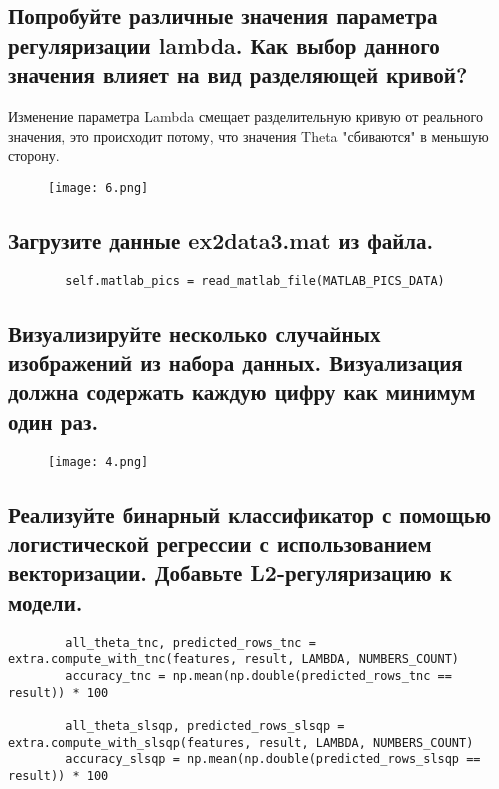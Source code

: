 \subsection{Попробуйте различные значения параметра регуляризации lambda. Как выбор данного значения влияет на вид разделяющей кривой?}

Изменение параметра Lambda смещает разделительную кривую от реального значения, это происходит потому, что значения Theta "сбиваются" в меньшую сторону.

\begin{figure}[h]
\centering
    \texttt{[image: 6.png]}
    \label{sec:purpose:payings}
\end{figure}

\subsection{Загрузите данные ex2data3.mat из файла.}

\begin{lstlisting}
        self.matlab_pics = read_matlab_file(MATLAB_PICS_DATA)
\end{lstlisting}

\subsection{Визуализируйте несколько случайных изображений из набора данных. Визуализация должна содержать каждую цифру как минимум один раз.}

\begin{figure}[h]
\centering
    \texttt{[image: 4.png]}
    \label{sec:purpose:payings}
\end{figure}

\subsection{Реализуйте бинарный классификатор с помощью логистической регрессии с использованием векторизации. Добавьте L2-регуляризацию к модели.
}

\begin{lstlisting}
        all_theta_tnc, predicted_rows_tnc = extra.compute_with_tnc(features, result, LAMBDA, NUMBERS_COUNT)
        accuracy_tnc = np.mean(np.double(predicted_rows_tnc == result)) * 100

        all_theta_slsqp, predicted_rows_slsqp = extra.compute_with_slsqp(features, result, LAMBDA, NUMBERS_COUNT)
        accuracy_slsqp = np.mean(np.double(predicted_rows_slsqp == result)) * 100
\end{lstlisting}

